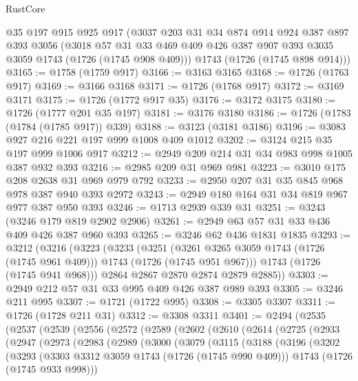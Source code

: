 \begin{lexlean}{RustCore}
\begin{coremodule}
    @35
    @197
    @915
    @925
    @917
    (@3037
      @203
      @31
      @34
      @874
      @914
      @924
      @387
      @897
      @393
      @3056
      (@3018 @57 @31 @33 @469 @409 @426 @387 @907 @393 @3035 @3059 @1743 (@1726 (@1745 @908 @409)))
      @1743
      (@1726 (@1745 @898 @914)))
@3165 := @1758 (@1759 @917)
@3166 := @3163 @3165
@3168 := @1726 (@1763 @917)
@3169 := @3166 @3168
@3171 := @1726 (@1768 @917)
@3172 := @3169 @3171
@3175 := @1726 (@1772 @917 @35)
@3176 := @3172 @3175
@3180 := @1726 (@1777 @201 @35 @197)
@3181 := @3176 @3180
@3186 := @1726 (@1783 (@1784 (@1785 @917)) @339)
@3188 := @3123 (@3181 @3186)
@3196 := @3083 @927 @216 @221 @197 @999 @1008 @409 @1012
@3202 := @3124 @215 @35 @197 @999 @1006 @917
@3212 := @2949 @209 @214 @31 @34 @983 @998 @1005 @387 @932 @393
@3216 := @2985 @209 @31 @969 @981
@3223 := @3010 @175 @208 @2638 @31 @969 @979 @792
@3233 := @2950 @207 @31 @35 @845 @968 @978 @387 @940 @393 @2972
@3243 := @2949 @180 @164 @31 @34 @819 @967 @977 @387 @950 @393
@3246 := @1713 @2939 @339 @31
@3251 := @3243 (@3246 @179 @819 @2902 @2906)
@3261 := @2949 @63 @57 @31 @33 @436 @409 @426 @387 @960 @393
@3265 := @3246 @62 @436 @1831 @1835
@3293 := @3212
    (@3216
      (@3223
        (@3233
          (@3251
            (@3261 @3265 @3059 @1743 (@1726 (@1745 @961 @409)))
            @1743
            (@1726 (@1745 @951 @967)))
          @1743
          (@1726 (@1745 @941 @968)))
        @2864
        @2867
        @2870
        @2874
        @2879
        @2885))
@3303 := @2949 @212 @57 @31 @33 @995 @409 @426 @387 @989 @393
@3305 := @3246 @211 @995
@3307 := @1721 (@1722 @995)
@3308 := @3305 @3307
@3311 := @1726 (@1728 @211 @31)
@3312 := @3308 @3311
@3401 := @2494
    (@2535
      (@2537
        (@2539
          (@2556
            (@2572
              (@2589
                (@2602
                  (@2610
                    (@2614
                      (@2725
                        (@2933
                          (@2947
                            (@2973
                              (@2983
                                (@2989
                                  (@3000
                                    (@3079
                                      (@3115
                                        (@3188
                                          (@3196
                                            (@3202
                                              (@3293
                                                (@3303 @3312 @3059 @1743 (@1726 (@1745 @990 @409)))
                                                @1743
                                                (@1726 (@1745 @933 @998)))

\end{coremodule}
\end{lexlean}
